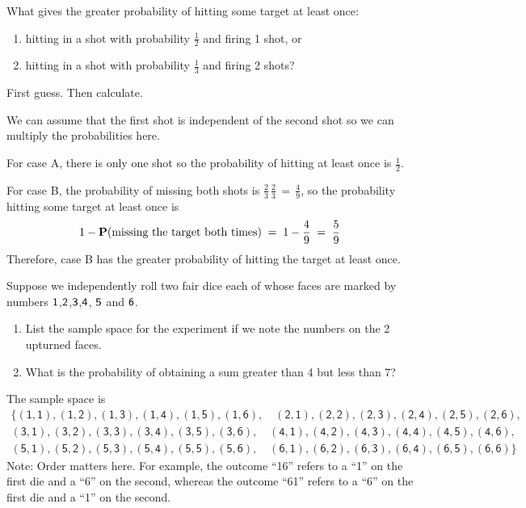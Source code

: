 \begin{ExerciseList}

\Exercise
What gives the greater probability of hitting some target at least
  once: 
\begin{enumerate}
\item  hitting in a shot with probability $\frac{1}{2}$ and firing 1 shot, or 
\item hitting in a shot with probability $\frac{1}{3}$ and firing 2 shots?
\end{enumerate}
First guess. Then calculate.

\Answer
We can assume  that the first shot is independent of
the second shot so we can multiply the probabilities here.

For case A, there is only one shot so the probability of hitting at least once is $\frac{1}{2}$.

For case B, the probability of missing both shots is
$\frac{2}{3}\,\frac{2}{3}\,=\,\frac{4}{9}$,  so  the probability hitting some target at least once is
  \[ 1- \mathbf{P}(\text{missing the target both times})\;=\; 1-\frac{4}{9}\;=\;\frac{5}{9}\]
Therefore, case B has the greater probability of hitting the target at least once.

\Exercise
Suppose we independently roll two fair dice each of whose faces are marked by numbers
  $\sf 1$,$\sf 2$,$\sf 3$,$\sf 4$, $\sf 5$ and $\sf 6$.
\begin{enumerate}
\item List the sample space for the experiment if we note the   numbers
  on the 2 upturned faces.
\item What is the probability of obtaining a sum greater than 4 but less
  than 7?
\end{enumerate}

\Answer
\be
\item The sample space is
$$
\begin{aligned}
\{
\mathsf{(1,1),(1,2),(1,3),(1,4),(1,5),(1,6),\quad (2,1),(2,2),(2,3),(2,4),(2,5),(2,6),}\\
\mathsf{(3,1),(3,2),(3,3),(3,4),(3,5),(3,6),\quad (4,1),(4,2),(4,3),(4,4),(4,5),(4,6),}\\
\mathsf{(5,1),(5,2),(5,3),(5,4),(5,5),(5,6),\quad (6,1),(6,2),(6,3),(6,4),(6,5),(6,6)}
\}
\end{aligned}
$$
Note: Order matters here. For example, the outcome ``16'' refers to a ``1'' on the first die and a ``6'' on the second,
whereas the outcome ``61'' refers to a ``6'' on the first die and a ``1'' on the
second.


\end{ExerciseList}
